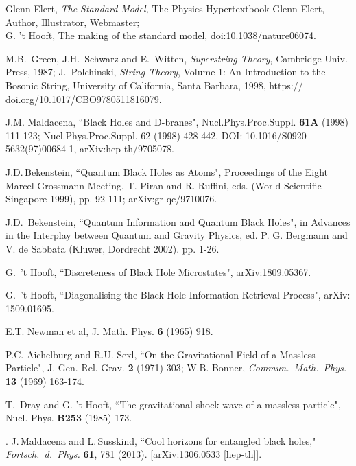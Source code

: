 \documentclass[12pt]{article}
\begin{document}
\begin{thebibliography}{99}

 Glenn Elert, \emph{The Standard Model,} The Physics Hypertextbook
 Glenn Elert, Author, Illustrator, Webmaster;\\
G. 't Hooft, The making of the standard model, doi:10.1038/nature06074.

 M.B.~Green, J.H.~Schwarz and E.~Witten, \textit{Superstring
Theory}, Cambridge Univ. Press, 1987;
J.~Polchinski, \emph{String Theory}, Volume 1: An Introduction to the Bosonic String,
University of California, Santa Barbara, 1998, https:// doi.org/10.1017/CBO9780511816079.

 J.M. Maldacena, ``Black Holes and D-branes", Nucl.Phys.Proc.Suppl. \textbf{61A} (1998) 111-123; Nucl.Phys.Proc.Suppl. 62 (1998) 428-442, DOI:	10.1016/S0920-5632(97)00684-1, arXiv:hep-th/9705078.

 J.D.\,Bekenstein, ``{Quantum Black Holes as Atoms}", Proceedings of the Eight Marcel Grossmann Meeting, T. Piran and R. Ruffini, eds. (World Scientific Singapore 1999), pp. 92-111;  arXiv:gr-qc/9710076.

 J.D.\, Bekenstein, ``Quantum Information and Quantum Black Holes", in Advances in the Interplay between Quantum and Gravity Physics, ed. P. G. Bergmann and V. de Sabbata (Kluwer, Dordrecht 2002). pp. 1-26.

 G.~'t Hooft, ``Discreteness of Black Hole Microstates", arXiv:1809.05367.

 G.\ 't Hooft, ``Diagonalising the Black Hole Information Retrieval Process",  arXiv: 1509.01695.

 E.T. Newman et al, J. Math. Phys. \textbf{6} (1965) 918.

 P.C. Aichelburg and R.U. Sexl, ``On the Gravitational Field of a Massless Particle", J. Gen. Rel. Grav. \textbf{2} (1971)  303;  W.B. Bonner, \textit{Commun.~Math.~Phys.} \textbf{13} (1969) 163-174.    

  T.~Dray and G. 't Hooft, ``The gravitational shock wave of a massless particle",  Nucl. Phys. \textbf{B253} (1985) 173.

. J.\,Maldacena and L.\,Susskind, ``Cool horizons for entangled black holes,"
\textit{Fortsch.~d.\, Phys.} \textbf{61}, 781 (2013). [arXiv:1306.0533 [hep-th]]. 


\end{thebibliography}
\end{document}
